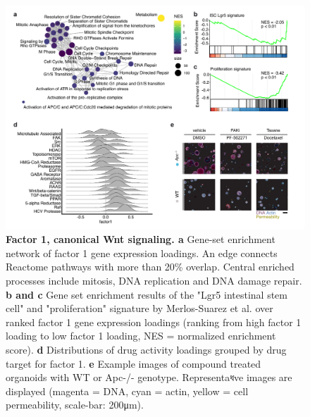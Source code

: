 \begin{flushleft}
\begin{figure}[H]
\centering
\includegraphics[width=\textwidth,
                height=\textheight,
                keepaspectratio]{figures/adenomaprofiling/pdf/fig_2_1.pdf}
\caption{\textbf{Factor 1, canonical Wnt signaling. a} Gene-set enrichment network of factor 1 gene expression loadings. An edge connects Reactome pathways with more than 20\% overlap. Central enriched processes include mitosis, DNA replication and DNA damage repair. \textbf{b and c} Gene set enrichment results of the "Lgr5 intestinal stem cell" and "proliferation" signature by Merlos-Suarez et al. over ranked factor 1 gene expression loadings (ranking from high factor 1 loading to low factor 1 loading, NES = normalized enrichment score). \textbf{d} Distributions of drug activity loadings grouped by drug target for factor 1. \textbf{e} Example images of compound treated organoids with WT or Apc-/- genotype. Representaধve images are displayed (magenta = DNA, cyan = actin, yellow = cell permeability, scale-bar: 200μm).}
\label{fig_190}
\end{figure}
\bigbreak


\end{flushleft}
